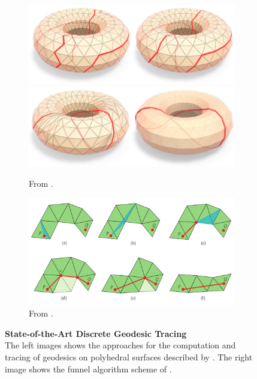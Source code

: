 \documentclass{stdlocal}
\begin{document}
\begin{figure}[t]
  \centering
  \begin{subfigure}[b]{0.4\textwidth}
    \centering
    \begin{minipage}{\linewidth}
      \includegraphics[width=\linewidth]{images/sharp2020-2.png} \\
      \includegraphics[width=\linewidth]{images/sharp2020-1.png}
    \end{minipage}
    \caption{From \textcite{sharp2020}.}
  \end{subfigure}
  \begin{subfigure}[b]{0.58\textwidth}
    \centering
    \includegraphics[width=\linewidth]{images/mancinelli2022-2.png}
    \caption{From \textcite{mancinelli2022}.}
  \end{subfigure}
  \caption[State-of-the-Art Discrete Geodesic Tracing]{%
    \textbf{State-of-the-Art Discrete Geodesic Tracing}\\
    The left images shows the approaches for the computation and tracing of geodesics on polyhedral surfaces described by \textcite{sharp2020}.
    The right image shows the funnel algorithm scheme of \textcite{mancinelli2022}.
  }
  \label{fig:related-work-geodesics-schemes}
\end{figure}
\end{document}
